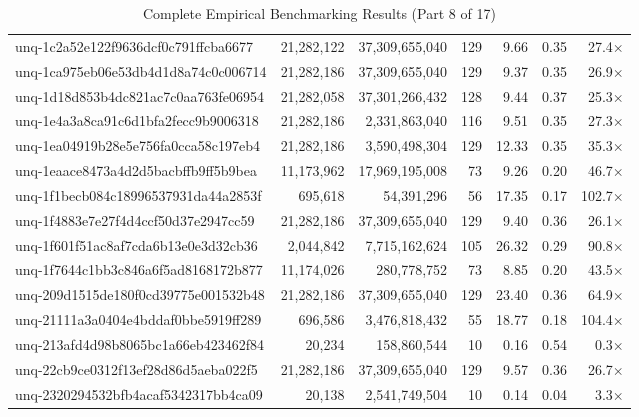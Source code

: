 \begin{table}[h!]
\begin{tabular}{lrrrrrr}
unq-1c2a52e122f9636dcf0c791ffcba6677 & 21,282,122 & 37,309,655,040 & 129 & 9.66 & 0.35 & 27.4$\times$ \\
unq-1ca975eb06e53db4d1d8a74c0c006714 & 21,282,186 & 37,309,655,040 & 129 & 9.37 & 0.35 & 26.9$\times$ \\
unq-1d18d853b4dc821ac7c0aa763fe06954 & 21,282,058 & 37,301,266,432 & 128 & 9.44 & 0.37 & 25.3$\times$ \\
unq-1e4a3a8ca91c6d1bfa2fecc9b9006318 & 21,282,186 & 2,331,863,040 & 116 & 9.51 & 0.35 & 27.3$\times$ \\
unq-1ea04919b28e5e756fa0cca58c197eb4 & 21,282,186 & 3,590,498,304 & 129 & 12.33 & 0.35 & 35.3$\times$ \\
unq-1eaace8473a4d2d5bacbffb9ff5b9bea & 11,173,962 & 17,969,195,008 & 73 & 9.26 & 0.20 & 46.7$\times$ \\
unq-1f1becb084c18996537931da44a2853f & 695,618 & 54,391,296 & 56 & 17.35 & 0.17 & 102.7$\times$ \\
unq-1f4883e7e27f4d4ccf50d37e2947cc59 & 21,282,186 & 37,309,655,040 & 129 & 9.40 & 0.36 & 26.1$\times$ \\
unq-1f601f51ac8af7cda6b13e0e3d32cb36 & 2,044,842 & 7,715,162,624 & 105 & 26.32 & 0.29 & 90.8$\times$ \\
unq-1f7644c1bb3c846a6f5ad8168172b877 & 11,174,026 & 280,778,752 & 73 & 8.85 & 0.20 & 43.5$\times$ \\
unq-209d1515de180f0cd39775e001532b48 & 21,282,186 & 37,309,655,040 & 129 & 23.40 & 0.36 & 64.9$\times$ \\
unq-21111a3a0404e4bddaf0bbe5919ff289 & 696,586 & 3,476,818,432 & 55 & 18.77 & 0.18 & 104.4$\times$ \\
unq-213afd4d98b8065bc1a66eb423462f84 & 20,234 & 158,860,544 & 10 & 0.16 & 0.54 & 0.3$\times$ \\
unq-22cb9ce0312f13ef28d86d5aeba022f5 & 21,282,186 & 37,309,655,040 & 129 & 9.57 & 0.36 & 26.7$\times$ \\
unq-2320294532bfb4acaf5342317bb4ca09 & 20,138 & 2,541,749,504 & 10 & 0.14 & 0.04 & 3.3$\times$ \\
\bottomrule
\end{tabular}
\caption{Complete Empirical Benchmarking Results (Part 8 of 17)}
\end{table}

\clearpage

